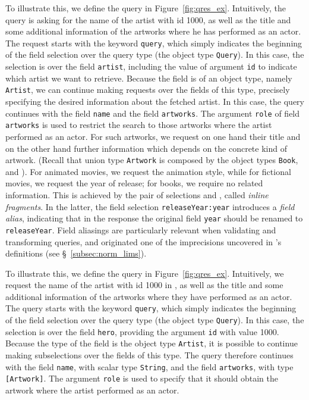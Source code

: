 To illustrate this, we define the query in
Figure~\ref{fig:qres_ex}. Intuitively, the query is asking for the
name of the artist with id 1000, as well as the title and some
additional information of the artworks where he has performed as an
actor.  The request starts with the keyword \texttt{query}, which
simply indicates the beginning of the field selection over the query
type (the object type \texttt{Query}).   In this case, the selection is over the field
\texttt{artist}, including the value of argument \texttt{id} to
indicate which artist we want to retrieve.  Because the field is of an
object type, namely \texttt{Artist}, we can continue making requests
over the fields of this type, precisely specifying the desired
information about the fetched artist. In this case, the query
continues with the field \texttt{name} and the field
\texttt{artworks}. The argument \texttt{role} of field
\texttt{artworks} is used to restrict the search to those artworks
where the artist performed as an actor.  For such artworks, we request
on one hand their title and on the other hand further information
which depends on the concrete kind of artwork. (Recall that union type
\texttt{Artwork} is composed by the object types \texttt{Book},
\fiction and \animation). For animated movies, we request the animation
style, while for fictional movies, we request the year of release; for books,
we require no related information. This is achieved by the pair of
selections  and , called {\em inline fragments}. In the
latter, the field selection \texttt{releaseYear:year} introduces a
{\em field alias}, indicating that in the response the original field
\texttt{year} should be renamed to \texttt{releaseYear}. Field
aliasings are particularly relevant when validating and transforming
queries, and originated one of the imprecisions uncovered in \HP's
definitions (see \S~\ref{subsec:norm_lims}).


\iffalse
To illustrate this, we define the query in
Figure~\ref{fig:qres_ex}. Intuitively, we request the name of the artist
with id 1000 in \goodbois, as well as the title and some additional
information of the artworks where they have performed as an actor.
The query starts with the keyword \texttt{query}, which simply indicates the beginning
 of the field selection over the query type (the object type \texttt{Query}).
In this case, the selection is over the field
\texttt{hero}, providing the argument
\texttt{id} with value 1000. 
Because the type of the field is the object type \texttt{Artist}, 
it is possible to continue making subselections over the fields of this type. 
The query therefore continues with the field \texttt{name}, with scalar type \texttt{String}, and the field
\texttt{artworks}, with type \texttt{[Artwork]}. The argument \texttt{role} is
used to specify that it should obtain the artwork where the artist performed as an actor.  

